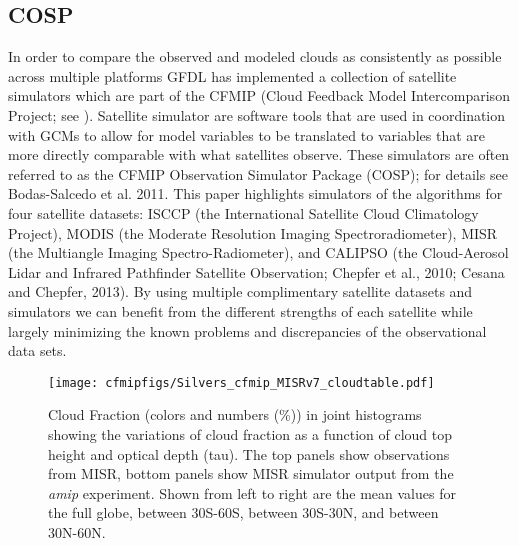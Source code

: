 \documentclass[draft]{agujournal2019}
\begin{document}
\subsection{COSP}
In order to compare the observed and modeled clouds as consistently as possible across multiple platforms 
GFDL has implemented a collection of satellite simulators which are part of the 
CFMIP (Cloud Feedback Model Intercomparison Project; see \cite{Webb_etal_2017}).  Satellite simulator
are software tools that are used in coordination with GCMs to allow for model variables 
to be translated to variables that are more directly comparable with what satellites observe.  
These simulators are often referred to as the CFMIP Observation Simulator Package (COSP); for
details see Bodas-Salcedo et al. 2011.  This paper highlights simulators of the algorithms for 
four satellite datasets: ISCCP (the International Satellite Cloud Climatology Project), 
MODIS (the Moderate Resolution Imaging Spectroradiometer), 
MISR (the Multiangle Imaging Spectro-Radiometer), and 
CALIPSO (the Cloud-Aerosol Lidar and Infrared Pathfinder Satellite Observation; 
Chepfer et al., 2010; Cesana and Chepfer, 2013).  By using multiple complimentary satellite 
datasets and simulators we can benefit from the different strengths of each satellite while largely 
minimizing the known problems and discrepancies of the observational data sets.      

\begin{figure}
  \centering
  \texttt{[image: cfmipfigs/Silvers\_cfmip\_MISRv7\_cloudtable.pdf]}
  \caption{Cloud Fraction (colors and numbers (\%)) in joint histograms showing the variations of cloud fraction 
  as a function of cloud top height and optical depth (tau).
  The top panels show observations from MISR, bottom panels show MISR simulator output from the 
  \textit{amip} experiment.  Shown from left to right are the mean values for the full globe, between 30S-60S,
  between 30S-30N, and between 30N-60N.}
  \label{fig:misr_sim_vs_mod}
\end{figure}
\end{document}
